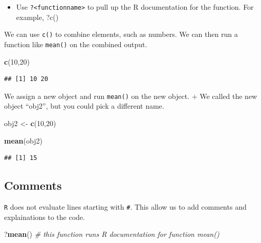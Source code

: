 \documentclass[
]{book}
\newenvironment{Shaded}{\begin{snugshade}}{\end{snugshade}}
\newcommand{\CommentTok}[1]{\textcolor[rgb]{0.56,0.35,0.01}{\textit{#1}}}
\newcommand{\DecValTok}[1]{\textcolor[rgb]{0.00,0.00,0.81}{#1}}
\newcommand{\FunctionTok}[1]{\textcolor[rgb]{0.13,0.29,0.53}{\textbf{#1}}}
\newcommand{\NormalTok}[1]{#1}
\newcommand{\OtherTok}[1]{\textcolor[rgb]{0.56,0.35,0.01}{#1}}
\providecommand{\tightlist}{%
  \setlength{\itemsep}{0pt}\setlength{\parskip}{0pt}}
\begin{document}
\begin{itemize}
\tightlist
\item
  Use \texttt{?\textless{}functionname\textgreater{}} to pull up the R documentation for the function. For example, ?c()
\end{itemize}

We can use \texttt{c()} to combine elements, such as numbers. We can then run a function like \texttt{mean()} on the combined output.

\begin{Shaded}
\begin{Highlighting}[]
\FunctionTok{c}\NormalTok{(}\DecValTok{10}\NormalTok{,}\DecValTok{20}\NormalTok{)}
\end{Highlighting}
\end{Shaded}

\begin{verbatim}
## [1] 10 20
\end{verbatim}

We assign a new object and run \texttt{mean()} on the new object.
+ We called the new object ``obj2'', but you could pick a different name.

\begin{Shaded}
\begin{Highlighting}[]
\NormalTok{obj2 }\OtherTok{\textless{}{-}} \FunctionTok{c}\NormalTok{(}\DecValTok{10}\NormalTok{,}\DecValTok{20}\NormalTok{)}

\FunctionTok{mean}\NormalTok{(obj2)}
\end{Highlighting}
\end{Shaded}

\begin{verbatim}
## [1] 15
\end{verbatim}

\subsection*{Comments}\label{comments}

\texttt{R} does not evaluate lines starting with \texttt{\#}. This allow us to add comments and explainations to the code.

\begin{Shaded}
\begin{Highlighting}[]
\NormalTok{?}\FunctionTok{mean}\NormalTok{() }\CommentTok{\# this function runs R documentation for function mean()}
\end{Highlighting}
\end{Shaded}
\end{document}
